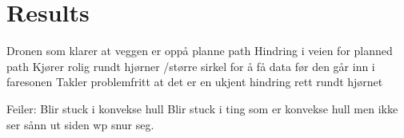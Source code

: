 \section{Results}
 Dronen som klarer at veggen er oppå planne path
    Hindring i veien for planned path
    Kjører rolig rundt hjørner /større sirkel for å få data før den går inn i faresonen
    Takler problemfritt at det er en ukjent hindring rett rundt hjørnet
    
    Feiler:
        Blir stuck i konvekse hull
        Blir stuck i ting som er konvekse hull men ikke ser sånn ut siden wp snur seg.